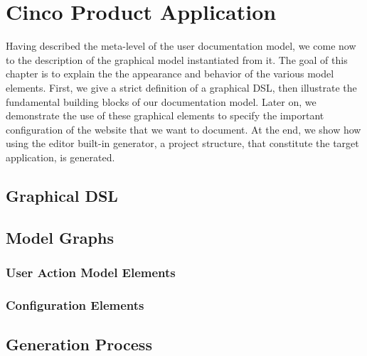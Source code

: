 \chapter{Cinco Product Application}\label{ch:CP}
Having described the meta-level of the user documentation model, we come now to the description of the graphical model instantiated from it. The goal of this chapter is to explain the the appearance and behavior of the various model elements. First, we give a strict definition of a graphical DSL, then illustrate the fundamental building blocks of our documentation model. Later on, we demonstrate the use of these graphical elements to specify the important configuration of the website that we want to document. At the end, we show how using the editor built-in generator, a project structure, that constitute the target application, is generated.
    \section{Graphical DSL}\label{sec:gDSL}
    \section{Model Graphs}\label{sec:ModElem}
        \subsection{User Action Model Elements}\label{sec:FuncElem}
        \subsection{Configuration Elements}\label{sec:ConfElem}
    \section{Generation Process}